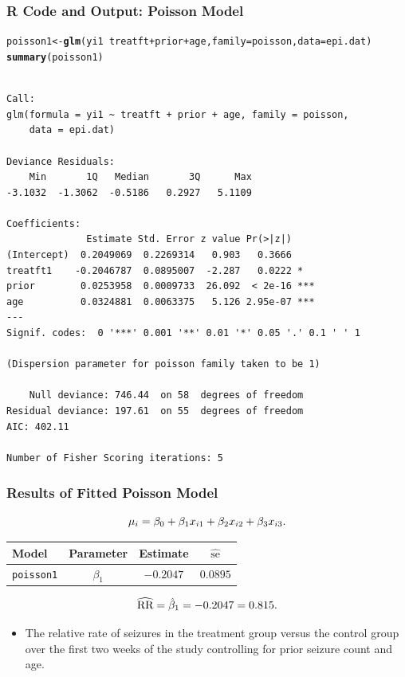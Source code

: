\documentclass[oneside]{book}\usepackage[]{graphicx}\usepackage[svgnames]{xcolor}
\makeatletter
\newcommand{\hlopt}[1]{\textcolor[rgb]{0,0,0}{#1}}%
\newcommand{\hlstd}[1]{\textcolor[rgb]{0.345,0.345,0.345}{#1}}%
\newcommand{\hlkwb}[1]{\textcolor[rgb]{0.69,0.353,0.396}{#1}}%
\newcommand{\hlkwc}[1]{\textcolor[rgb]{0.333,0.667,0.333}{#1}}%
\newcommand{\hlkwd}[1]{\textcolor[rgb]{0.737,0.353,0.396}{\textbf{#1}}}%
\newenvironment{kframe}{%
 \def\at@end@of@kframe{}%
 \ifinner\ifhmode%
  \def\at@end@of@kframe{\end{minipage}}%
  \begin{minipage}{\columnwidth}%
 \fi\fi%
 \def\FrameCommand##1{\hskip\@totalleftmargin \hskip-\fboxsep
 \colorbox{shadecolor}{##1}\hskip-\fboxsep
     \hskip-\linewidth \hskip-\@totalleftmargin \hskip\columnwidth}%
 \MakeFramed {\advance\hsize-\width
   \@totalleftmargin\z@ \linewidth\hsize
   \@setminipage}}%
 {\par\unskip\endMakeFramed%
 \at@end@of@kframe}
\newenvironment{knitrout}{}{} %
\let\exp\relax%
\let\log\relax%
\newcommand{\RR}{\text{RR}}%
\makeatother
\begin{document}
\subsubsection*{R Code and Output: Poisson Model}
\begin{knitrout}
\color{fgcolor}\begin{kframe}
\begin{alltt}
\hlstd{poisson1} \hlkwb{<-} \hlkwd{glm}\hlstd{(yi1} \hlopt{~} \hlstd{treatft} \hlopt{+} \hlstd{prior} \hlopt{+} \hlstd{age,} \hlkwc{family} \hlstd{= poisson,} \hlkwc{data} \hlstd{= epi.dat)}
\hlkwd{summary}\hlstd{(poisson1)}
\end{alltt}
\begin{verbatim}

Call:
glm(formula = yi1 ~ treatft + prior + age, family = poisson, 
    data = epi.dat)

Deviance Residuals: 
    Min       1Q   Median       3Q      Max  
-3.1032  -1.3062  -0.5186   0.2927   5.1109  

Coefficients:
              Estimate Std. Error z value Pr(>|z|)    
(Intercept)  0.2049069  0.2269314   0.903   0.3666    
treatft1    -0.2046787  0.0895007  -2.287   0.0222 *  
prior        0.0253958  0.0009733  26.092  < 2e-16 ***
age          0.0324881  0.0063375   5.126 2.95e-07 ***
---
Signif. codes:  0 '***' 0.001 '**' 0.01 '*' 0.05 '.' 0.1 ' ' 1

(Dispersion parameter for poisson family taken to be 1)

    Null deviance: 746.44  on 58  degrees of freedom
Residual deviance: 197.61  on 55  degrees of freedom
AIC: 402.11

Number of Fisher Scoring iterations: 5
\end{verbatim}
\end{kframe}
\end{knitrout}
\subsubsection*{Results of Fitted Poisson Model}
\[ \log{\mu_i}=\beta_0+\beta_1x_{i1}+\beta_2x_{i2}+\beta_3x_{i3}. \]
\begin{table}[H]
    \centering
    \begin{tabular}{lccc}
        Model             & Parameter   & Estimate    & $ \widehat{\text{se}} $ \\
        \midrule
        \texttt{poisson1} & $ \beta_1 $ & $ -0.2047 $ & $ 0.0895 $              \\
        \bottomrule
    \end{tabular}
\end{table}
\[ \widehat{\RR}=\exp{\hat{\beta}_1}=\exp{-0.2047}=0.815. \]
\begin{itemize}
    \item The relative rate of seizures in the treatment group versus the control group over
          the first two weeks of the study controlling for prior seizure count and age.
\end{itemize}
\end{document}

